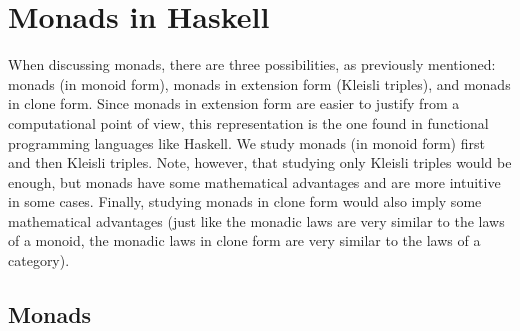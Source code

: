 
\begin{example}
  \label{ex:monad-triple-identity}

\end{example}


\section{Monads in Haskell}
\label{sec:monads-haskell}

When discussing monads, there are three possibilities, as previously
mentioned: monads (in monoid form), monads in extension form (Kleisli
triples), and monads in clone form. Since monads in extension form are
easier to justify from a computational point of view, this
representation is the one found in functional programming languages
like Haskell. We study monads (in monoid form) first and then Kleisli
triples. Note, however, that studying only Kleisli triples would be
enough, but monads have some mathematical advantages and are more
intuitive in some cases. Finally, studying monads in clone form would
also imply some mathematical advantages (just like the monadic laws
are very similar to the laws of a monoid, the monadic laws in clone
form are very similar to the laws of a category).

\subsection*{Monads}

